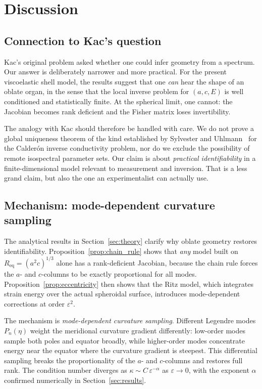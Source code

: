 \section{Discussion}\label{sec:discussion}

\subsection{Connection to Kac's question}

Kac's original problem asked whether one could infer geometry from a spectrum.
Our answer is deliberately narrower and more practical.  For the present
viscoelastic shell model, the results suggest that one \emph{can} hear the shape
of an oblate organ, in the sense that the local inverse problem for
$(a,c,E)$ is well conditioned and statistically finite.  At the spherical
limit, one cannot: the Jacobian becomes rank deficient and the Fisher matrix
loses invertibility.

The analogy with Kac should therefore be handled with care.  We do not prove a
global uniqueness theorem of the kind established by Sylvester and
Uhlmann~\cite{SylvesterUhlmann1987} for the Calder\'on inverse conductivity
problem, nor do we exclude the possibility of remote isospectral parameter sets.
Our claim is about \emph{practical identifiability} in a finite-dimensional
model relevant to measurement and inversion.  That is a less grand claim, but
also the one an experimentalist can actually use.

\subsection{Mechanism: mode-dependent curvature sampling}

The analytical results in Section~\ref{sec:theory} clarify why oblate geometry
restores identifiability.  Proposition~\ref{prop:chain_rule} shows that \emph{any}
model built on $R_\mathrm{eq} = (a^2 c)^{1/3}$ alone has a rank-deficient
Jacobian, because the chain rule forces the $a$- and $c$-columns to be exactly
proportional for all modes.  Proposition~\ref{prop:eccentricity} then shows
that the Ritz model, which integrates strain energy over the actual spheroidal
surface, introduces mode-dependent corrections at order $\varepsilon^2$.

The mechanism is \emph{mode-dependent curvature sampling}.  Different Legendre
modes $P_n(\eta)$ weight the meridional curvature gradient differently: low-order
modes sample both poles and equator broadly, while higher-order modes
concentrate energy near the equator where the curvature gradient is steepest.
This differential sampling breaks the proportionality of the $a$- and $c$-columns
and restores full rank.  The condition number diverges as
$\kappa \sim C\,\varepsilon^{-\alpha}$ as $\varepsilon \to 0$, with the
exponent $\alpha$ confirmed numerically in Section~\ref{sec:results}.

